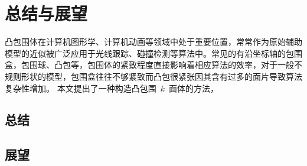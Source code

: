 

\chapter{总结与展望}
\label{cha:summery:futurework}

凸包围体在计算机图形学、计算机动画等领域中处于重要位置，常常作为原始辅助模型的近似被广泛应用于光线跟踪、碰撞检测等算法中。常见的有沿坐标轴的包围盒，包围球、凸包等，包围体的紧致程度直接影响着相应算法的效率，对于一般不规则形状的模型，包围盒往往不够紧致而凸包很紧张因其含有过多的面片导致算法复杂性增加。
本文提出了一种构造凸包围~$k$~面体的方法，

\section{总结}
\label{sec:summery}


\section{展望}
\label{sec:futurework}
